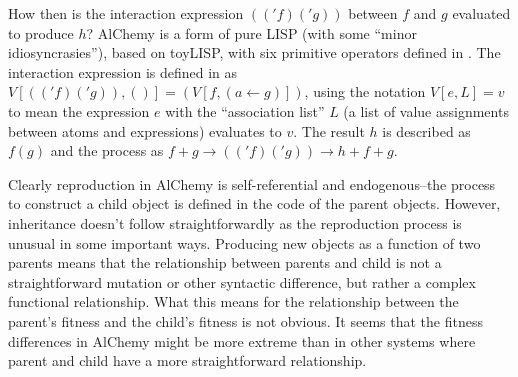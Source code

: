 How then is the interaction expression $(('f)('g))$ between $f$ and $g$ evaluated to produce $h$? AlChemy is a form of pure LISP (with some ``minor idiosyncrasies''), based on toyLISP, with six primitive operators defined in \textcite[p.205]{Fontana1992}. The interaction expression is defined in \textcite[definition A.9, p.204]{Fontana1992} as $V[(('f)('g)),()] = (V[f,(a\leftarrow g)])$, using the notation $V[e,L]=v$ to mean the expression $e$ with the ``association list'' $L$ (a list of value assignments between atoms and expressions) evaluates to $v$. The result $h$ is described as $f(g)$ and the process as $f+g \rightarrow (('f)('g)) \rightarrow h + f + g$.

Clearly reproduction in AlChemy is self-referential and endogenous--the process to construct a child object is defined in the code of the parent objects. However, inheritance doesn't follow straightforwardly as the reproduction process is unusual in some important ways. Producing new objects as a function of two parents means that the relationship between parents and child is not a straightforward mutation or other syntactic difference, but rather a complex functional relationship. What this means for the relationship between the parent's fitness and the child's fitness is not obvious. It seems that the fitness differences in AlChemy might be more extreme than in other systems where parent and child have a more straightforward relationship.

